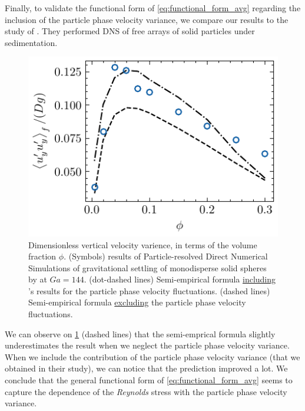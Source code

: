 Finally, to validate the functional form of \ref{eq:functional_form_avg} regarding the inclusion of the particle phase velocity variance, we compare our results to the study of \citet{shajahan2023inertial}. 
They performed DNS of free arrays of solid particles under sedimentation.  
\begin{figure}
    \centering
    \includegraphics[height = 0.25\textwidth]{image/HOMOGENEOUS_final/CA/tariq.pdf}
    \caption{Dimensionless vertical velocity varience, in terms of the volume fraction $\phi$. 
    (Symbols) results of Particle-resolved Direct Numerical Simulations  of gravitational settling of monodisperse solid spheres by \citet{shajahan2023inertial} at $Ga = 144$. 
    (dot-dashed lines) Semi-empirical formula \underline{including} \citet{shajahan2023inertial}'s results for the particle phase velocity fluctuations. 
    (dashed lines) Semi-empirical formula \underline{excluding} the particle phase velocity fluctuations. 
    }
    \label{fig:tariq}
\end{figure}
We can observe on \ref{fig:tariq} (dashed lines) that the semi-emprical formula slightly underestimates the result when we neglect the particle phase velocity variance. 
When we include the contribution of the particle phase velocity variance (that we obtained in their study), we can notice that the prediction improved a lot. 
We conclude that the general functional form of \ref{eq:functional_form_avg} seems to capture the dependence of the \textit{Reynolds} stress with the particle phase velocity variance. 
